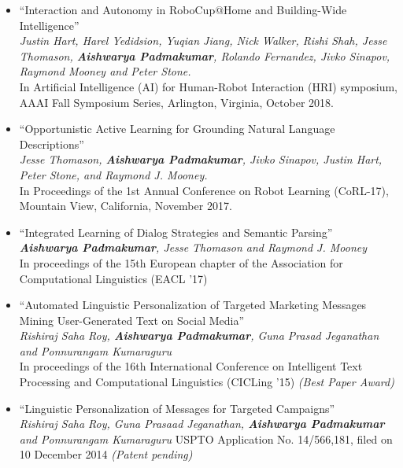\documentclass[letterpaper,10pt]{resume}
\begin{document}
{\begin{itemize}
\item  ``Interaction and Autonomy in RoboCup@Home and Building-Wide Intelligence'' \\
\textit{Justin Hart, Harel Yedidsion, Yuqian Jiang, Nick Walker, Rishi Shah, Jesse Thomason, \textbf{Aishwarya Padmakumar}, Rolando Fernandez, Jivko Sinapov, Raymond Mooney and Peter Stone. } \\
In Artificial Intelligence (AI) for Human-Robot Interaction (HRI) symposium, AAAI Fall Symposium Series, Arlington, Virginia, October 2018. 
\vspace{0.2cm}

\item  ``Opportunistic Active Learning for Grounding Natural Language Descriptions'' \\
\textit{Jesse Thomason, \textbf{Aishwarya Padmakumar}, Jivko Sinapov, Justin Hart, Peter Stone, and Raymond J. Mooney.} \\
In Proceedings of the 1st Annual Conference on Robot Learning (CoRL-17), Mountain View, California, November 2017. 
\vspace{0.2cm}

\item  ``Integrated Learning of Dialog Strategies and Semantic Parsing'' \\
\textit{\textbf{Aishwarya Padmakumar}, Jesse Thomason and Raymond J. Mooney} \\
In proceedings of the 15th European chapter of the Association for Computational Linguistics (EACL '17) 
\vspace{0.2cm}


\item  ``Automated Linguistic Personalization of Targeted Marketing Messages Mining User-Generated Text on Social Media'' \\
\textit{Rishiraj Saha Roy, \textbf{Aishwarya Padmakumar}, Guna Prasad Jeganathan and Ponnurangam Kumaraguru} \\
In proceedings of the 16th International Conference on Intelligent Text Processing and Computational Linguistics (CICLing ’15) \textit{(Best Paper Award)}
\vspace{0.2cm}

\item ``Linguistic Personalization of Messages for Targeted Campaigns'' \\
\textit{Rishiraj Saha Roy, Guna Prasaad Jeganathan, \textbf{Aishwarya Padmakumar} and Ponnurangam Kumaraguru}
USPTO Application No. 14/566,181, filed on 10 December 2014 \textit{(Patent pending)}
\vspace{0.2cm}
\end{itemize}

}
\end{document}
